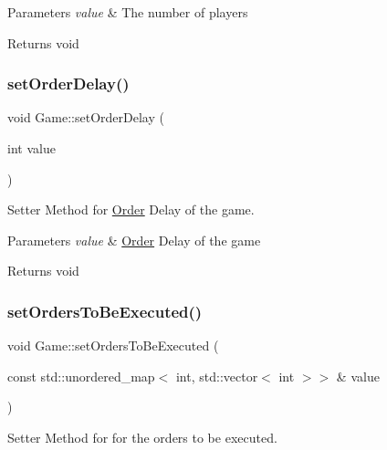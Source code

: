\begin{DoxyParams}{Parameters}
{\em value} & The number of players \\
\hline
\end{DoxyParams}
\begin{DoxyReturn}{Returns}
void 
\end{DoxyReturn}
\mbox{\label{classGame_ac7a3b5df537efe026c2010f95674b2dc}} 
\subsubsection{\texorpdfstring{set\+Order\+Delay()}{setOrderDelay()}}
{\footnotesize\ttfamily void Game\+::set\+Order\+Delay (\begin{DoxyParamCaption}\item[{int}]{value }\end{DoxyParamCaption})}



Setter Method for \hyperlink{classOrder}{Order} Delay of the game. 


\begin{DoxyParams}{Parameters}
{\em value} & \hyperlink{classOrder}{Order} Delay of the game \\
\hline
\end{DoxyParams}
\begin{DoxyReturn}{Returns}
void 
\end{DoxyReturn}
\mbox{\label{classGame_ac0bea8d7a92601d7739b1e18c8fc3379}} 
\subsubsection{\texorpdfstring{set\+Orders\+To\+Be\+Executed()}{setOrdersToBeExecuted()}}
{\footnotesize\ttfamily void Game\+::set\+Orders\+To\+Be\+Executed (\begin{DoxyParamCaption}\item[{const std\+::unordered\+\_\+map$<$ int, std\+::vector$<$ int $>$$>$ \&}]{value }\end{DoxyParamCaption})}



Setter Method for for the orders to be executed. 


